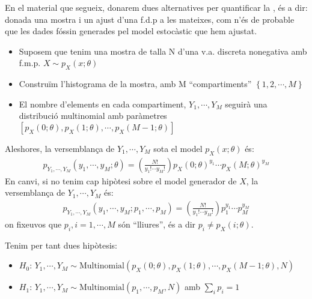 \documentclass[letterpaper,10pt,english]{sphinxmanual}
\begin{document}
En el material que segueix, donarem dues alternatives per quantificar la ,
és a dir: donada una mostra i un ajust d’una f.d.p a les mateixes, com n’és de probable
que les dades fóssin generades pel model estocàstic que hem ajustat.
\begin{itemize}
\item {} 
Suposem que tenim una mostra de talla N d’una v.a. discreta no\sphinxhyphen{}negativa amb f.m.p. \(X \sim p_X(x;\theta)\)

\item {} 
Construïm l’histograma de la mostra, amb M “compartiments” \(\left\{1, 2, \cdots, M\right\}\)

\item {} 
El nombre d’elements en cada compartiment, \(Y_1, \cdots, Y_M\) seguirà una distribució multinomial amb paràmetres \([p_X(0;\theta), p_X(1;\theta), \cdots, p_X(M-1;\theta)]\)

\end{itemize}

Aleshores, la versemblança de \(Y_1, \cdots, Y_M\) sota el model \(p_X(x;\theta)\) és:
\begin{equation*}
\begin{split}p_{Y_1, \cdots, Y_M}(y_1, \cdots, y_M; \theta) = \left( \frac{N!}{y_1! \cdots y_M!} \right) p_X(0;\theta)^{y_1} \cdots p_X(M;\theta)^{y_M}\end{split}
\end{equation*}
En canvi, si no tenim cap hipòtesi sobre el model generador de \(X\), la versemblança de
\(Y_1, \cdots, Y_M\) és:
\begin{equation*}
\begin{split}p_{Y_1, \cdots, Y_M}(y_1, \cdots, y_M; p_1, \cdots, p_M) = \left( \frac{N!}{y_1! \cdots y_M!} \right) p_1^{y_1} \cdots p_M^{y_M}\end{split}
\end{equation*}
on fixeu\sphinxhyphen{}vos que \(p_i, i=1,\cdots,M\) són “lliures”, és a dir \(p_i \neq p_X(i;\theta)\).

Tenim per tant dues hipòtesis:
\begin{itemize}
\item {} 
\(H_0\): \(Y_1, \cdots, Y_M \sim \mbox{Multinomial}\left(p_X(0;\theta), p_X(1;\theta), \cdots, p_X(M-1;\theta), N\right)\)

\item {} 
\(H_1\): \(Y_1, \cdots, Y_M \sim \mbox{Multinomial}\left(p_1, \cdots, p_M, N\right)\) amb \(\sum_i p_i =1\)

\end{itemize}
\end{document}
